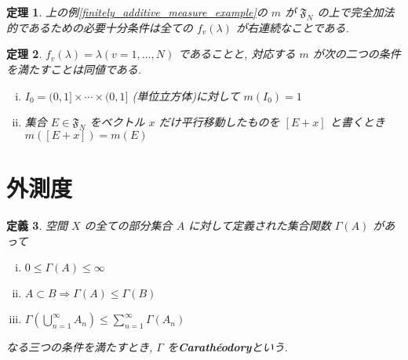 \documentclass[dvipdfmx]{jsreport}
\newtheorem{theo}{定理}[section]
\newtheorem{defi}[theo]{定義}
\begin{document}
\begin{theo}
    上の例\ref{finitely_additive_measure_example}の $m$ が $\mathfrak{F}_N$ の上で完全加法的であるための必要十分条件は全ての $f_v(\lambda)$ が右連続なことである. 
\end{theo}

\begin{theo}
    $f_v(\lambda) = \lambda (v = 1, \dots, N)$ であることと, 対応する $m$ が次の二つの条件を満たすことは同値である. 
    \begin{enumerate}[(i)]
        \item $I_0 = (0, 1] \times \cdots \times (0, 1]$ (単位立方体)に対して $m(I_0) = 1$
        \item 集合 $E \in \mathfrak{F}_N$ をベクトル $x$ だけ平行移動したものを $[E + x]$ と書くとき $m([E + x]) = m(E)$
    \end{enumerate}
\end{theo}

\section{外測度}

\begin{defi}
    空間 $X$ の全ての部分集合 $A$ に対して定義された集合関数 $\Gamma(A)$ があって
    \begin{enumerate}[(i)]
        \item $0 \leq \Gamma(A) \leq \infty$
        \item $A \subset B \Rightarrow \Gamma(A) \leq \Gamma(B)$
        \item $\displaystyle \Gamma\left( \bigcup_{n = 1}^\infty A_n \right) \leq \sum_{n = 1}^\infty \Gamma(A_n)$
    \end{enumerate}
    なる三つの条件を満たすとき,  $\Gamma$ を{\bf Carathéodory}という. 
\end{defi}
\end{document}

